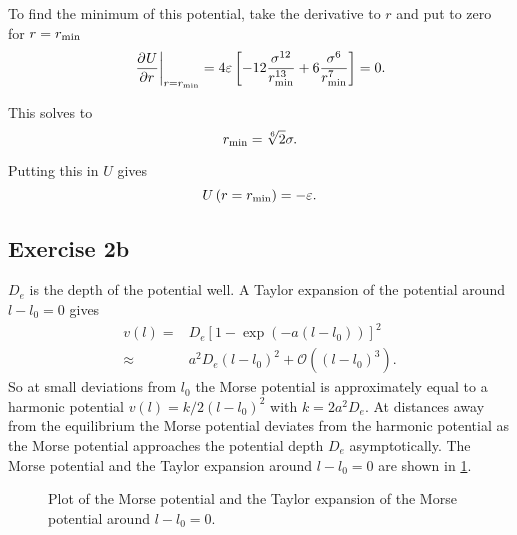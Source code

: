\documentclass[titlepage]{report}
\newcommand\inputpgf[2]{{
		\let\pgfimageWithoutPath\pgfimage 
		\renewcommand{\pgfimage}[2][]{\pgfimageWithoutPath[##1]{#1/##2}}
		
	}}
\newcommand\pgffigure[1]{{
			\beginpgfgraphicnamed{PGFFigures/#1}
			\inputpgf{Figures}{#1.pgf}
			\endpgfgraphicnamed
		}}
\begin{document}
To find the minimum of this potential, take the derivative to $ r $ and put to zero for $ r = r_{\rm{min}} $
\begin{equation}
	\left. \frac{\partial^{} {U}}{\partial {r}^{}} \right|_{r=r_{\rm{min}}} = 4 \varepsilon \left[ -12 \frac{\sigma^{12}}{r_{\rm{min}}^{13}} + 6\frac{\sigma^{6}}{r_{\rm{min}}^{7}} \right] = 0.
\end{equation}

This solves to
\begin{equation}
	r_{\rm{min}} = \sqrt[6]{2} \sigma.
\end{equation}

Putting this in $ U $ gives
\begin{equation}
	U\left(r = r_{\rm{min}}\right) = - \varepsilon.
\end{equation}

\subsection{Exercise 2b}
$ D_e $ is the depth of the potential well. 
A Taylor expansion of the potential around $ l - l_0 = 0 $ gives
\begin{subequations}
	\begin{align}
		v(l) =& D_e \left[ 1 - \exp\left(-a (l-l_0)\right) \right]^2 \\
		\approx& a^2 D_e (l-l_0)^2 + \mathcal{O}\left((l-l_0)^3\right).
	\end{align}
\end{subequations}
So at small deviations from $ l_0 $ the Morse potential is approximately equal to a harmonic potential $ v(l) = k/2 (l-l_0)^2 $ with $ k = 2 a^2 D_e $.
At distances away from the equilibrium the Morse potential deviates from the harmonic potential as the Morse potential approaches the potential depth $ D_e $ asymptotically. 
The Morse potential and the Taylor expansion around $ l - l_0 = 0 $ are shown in \cref{fig:THEX2b}.
\begin{figure}[h!]
	\centering
	\pgffigure{THEX2b}
	\caption{Plot of the Morse potential and the Taylor expansion of the Morse potential around $ l-l_0 = 0 $.}
	\label{fig:THEX2b}
\end{figure}
\end{document}
